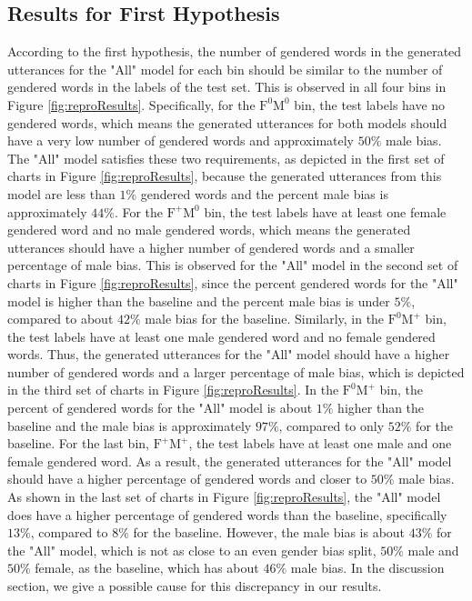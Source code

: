 \subsection{Results for First Hypothesis}
According to the first hypothesis, the number of gendered words in the generated utterances for the "All" model for each bin should be similar to the number of gendered words in the labels of the test set. This is observed in all four bins in Figure \ref{fig:reproResults}. Specifically, for the $\mathrm{F}^0\mathrm{M}^0$ bin, the test labels have no gendered words, which means the generated utterances for both models should have a very low number of gendered words and approximately $50\%$ male bias. The "All" model satisfies these two requirements, as depicted in the first set of charts in Figure \ref{fig:reproResults}, because the generated utterances from this model are less than $1\%$ gendered words and the percent male bias is approximately $44\%$. For the $\mathrm{F}^+\mathrm{M}^0$ bin, the test labels have at least one female gendered word and no male gendered words, which means the generated utterances should have a higher number of gendered words and a smaller percentage of male bias. This is observed for the "All" model in the second set of charts in Figure \ref{fig:reproResults}, since the percent gendered words for the "All" model is higher than the baseline and the percent male bias is under $5\%$, compared to about $42\%$ male bias for the baseline. Similarly, in the $\mathrm{F}^0\mathrm{M}^+$ bin, the test labels have at least one male gendered word and no female gendered words. Thus, the generated utterances for the "All" model should have a higher number of gendered words and a larger percentage of male bias, which is depicted in the third set of charts in Figure \ref{fig:reproResults}. In the $\mathrm{F}^0\mathrm{M}^+$ bin, the percent of gendered words for the "All" model is about $1\%$ higher than the baseline and the male bias is approximately $97\%$, compared to only $52\%$ for the baseline. For the last bin, $\mathrm{F}^+\mathrm{M}^+$, the test labels have at least one male and one female gendered word. As a result, the generated utterances for the "All" model should have a higher percentage of gendered words and closer to $50\%$ male bias. As shown in the last set of charts in Figure \ref{fig:reproResults}, the "All" model does have a higher percentage of gendered words than the baseline, specifically $13\%$, compared to $8\%$ for the baseline. However, the male bias is about $43\%$ for the "All" model, which is not as close to an even gender bias split, $50\%$ male and $50\%$ female, as the baseline, which has about $46\%$ male bias. In the discussion section, we give a possible cause for this discrepancy in our results.

